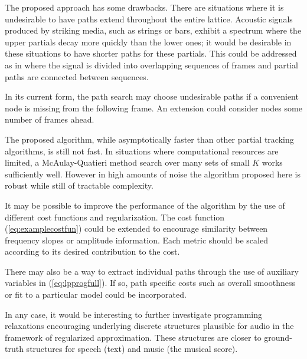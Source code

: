 \documentclass{article}
\begin{document}
\begin{sloppy}
The proposed approach has some drawbacks.
There are situations where it is undesirable to have paths extend
throughout the entire lattice. Acoustic signals produced by striking media, such
as strings or bars, exhibit a spectrum where the upper partials decay more
quickly than the lower ones; it
would be desirable in these situations to have shorter paths for these
partials. This could be addressed as in
\cite{depalle1993tracking} where the signal is divided into overlapping sequences of
frames and partial paths are connected between sequences.

In its current form, the path search may choose undesirable paths if a
convenient node is missing from the following frame. An extension could consider
nodes some number of frames ahead.

The proposed algorithm, while asymptotically faster than other partial tracking
algorithms, is still not fast. In situations where computational resources
are limited, a McAulay-Quatieri method search over many sets of small $K$ works
sufficiently well. However in high amounts of noise the algorithm proposed here
is robust while still of tractable complexity.

It may be possible to improve the performance of the algorithm by the use of
different cost functions and regularization. The cost function
(\ref{eq:examplecostfun}) could be extended to encourage similarity between
frequency slopes or amplitude information. Each metric should be scaled
according to its desired contribution to the cost.

There may also be a way to extract individual paths through the use of auxiliary
variables in (\ref{eq:lpprogfull}). If so, path specific costs such as overall
smoothness or fit to a particular model could be incorporated. 

In any case, it would be interesting to further investigate programming
relaxations encouraging underlying discrete structures plausible for audio
in the framework of regularized approximation. These structures are closer to
ground-truth structures for speech (text) and music (the musical score).





\end{sloppy}
\end{document}
